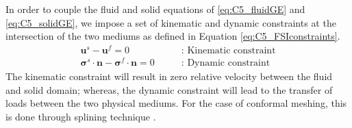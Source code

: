 In order to couple the fluid and solid equations of \eqref{eq:C5_fluidGE} and \eqref{eq:C5_solidGE}, we impose a set of kinematic and dynamic constraints \cite{van2007comparison} at the intersection of the two mediums as defined in Equation \eqref{eq:C5_FSIconstraints}.
%
\begin{subequations}\label{eq:C5_FSIconstraints}
\begin{align}
	\mathbf{u}^s - \mathbf{u}^f = 0
	\quad \quad &\text{: Kinematic constraint}
	\\
	\mathbf{\sigma}^s \cdot \mathbf{n} - \mathbf{\sigma}^f \cdot \mathbf{n} = 0
	\quad \quad &\text{: Dynamic constraint}
\end{align}
\end{subequations}
%
The kinematic constraint will result in zero relative velocity between the fluid and solid domain; whereas, the dynamic constraint will lead to the transfer of loads between the two physical mediums. For the case of conformal meshing, this is done through splining technique \cite{hounjet1995evaluation}.
